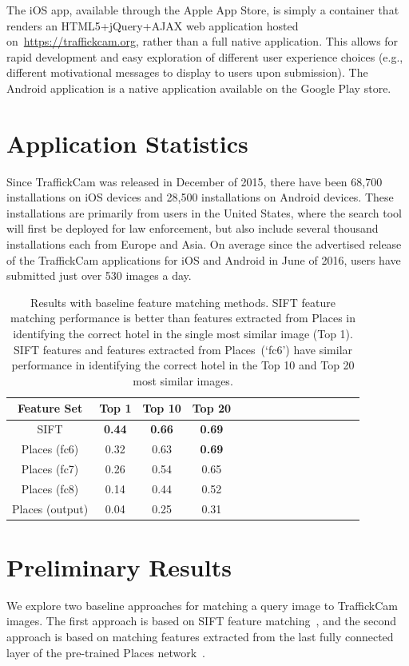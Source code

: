 The iOS app, available through the Apple App Store, is simply a container that renders an HTML5+jQuery+AJAX web application hosted on~\url{https://traffickcam.org}, rather than a full native application. This allows for rapid development and easy exploration of different user experience choices (e.g., different motivational messages to display to users upon submission). The Android application is a native application available on the Google Play store.

\section{Application Statistics}
Since TraffickCam was released in December of 2015, there have been 68,700 installations on iOS devices and 28,500 installations on Android devices. These installations are primarily from users in the United States, where the search tool will first be deployed for law enforcement, but also include several thousand installations each from Europe and Asia. On average since the advertised release of the TraffickCam applications for iOS and Android in June of 2016, users have submitted just over 530 images a day.

\begin{table}[t!]
  \begin{center}
    \begin{tabular}{*{15}{c}}
    \hline
    Feature Set & Top 1 & Top 10 & Top 20 \\
    \hline
    SIFT & \textbf{0.44} & \textbf{0.66} & \textbf{0.69} \\
    Places (fc6) & 0.32 & 0.63 & \textbf{0.69} \\
    Places (fc7) & 0.26 & 0.54 & 0.65 \\
    Places (fc8) & 0.14 & 0.44 & 0.52 \\
    Places (output) & 0.04 & 0.25 & 0.31
    \end{tabular}
  \end{center}
  \caption{Results with baseline feature matching methods. SIFT feature matching performance is better than features extracted from Places in identifying the correct hotel in the single most similar image (Top 1). SIFT features and features extracted from Places~(`fc6') have similar performance in identifying the correct hotel in the Top 10 and Top 20 most similar images.}
  \label{tab:results}
\end{table}

\section{Preliminary Results}
\label{methodology}
We explore two baseline approaches for matching a query image to TraffickCam images. The first approach is based on SIFT feature matching~\cite{lowe1999object}, and the second approach is based on matching features extracted from the last fully connected layer of the pre-trained Places network~\cite{zhou2014places}.


